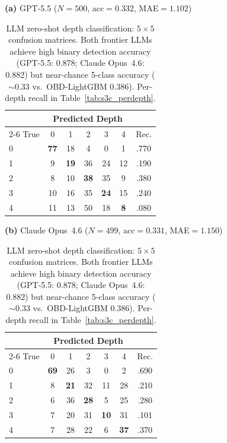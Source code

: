 \FloatBarrier
\begin{table}[t]
  \centering
  \scriptsize
  \caption{LLM zero-shot depth classification: $5{\times}5$ confusion matrices. Both frontier LLMs achieve high binary detection accuracy (GPT-5.5: 0.878; Claude Opus~4.6: 0.882) but near-chance 5-class accuracy (${\sim}$0.33 vs.\ OBD-LightGBM 0.386). Per-depth recall in Table~\ref{tab:s3c_perdepth}.}
  \label{tab:s3_llm_zeroshot}

  \vspace{0.3em}
  \textbf{(a)} GPT-5.5 ($N{=}500$, acc${=}0.332$, MAE${=}1.102$)
  \vspace{1pt}

  \begin{tabular}{lcccccc}
    \toprule
    & \multicolumn{5}{c}{Predicted Depth} & \\
    \cmidrule(lr){2-6}
    True & 0 & 1 & 2 & 3 & 4 & Rec. \\
    \midrule
    0 & \textbf{77} & 18 &  4 &  0 &  1 & .770 \\
    1 &  9 & \textbf{19} & 36 & 24 & 12 & .190 \\
    2 &  8 & 10 & \textbf{38} & 35 &  9 & .380 \\
    3 & 10 & 16 & 35 & \textbf{24} & 15 & .240 \\
    4 & 11 & 13 & 50 & 18 &  \textbf{8} & .080 \\
    \bottomrule
  \end{tabular}

  \vspace{4pt}
  \textbf{(b)} Claude Opus~4.6 ($N{=}499$, acc${=}0.331$, MAE${=}1.150$)
  \vspace{1pt}

  \begin{tabular}{lcccccc}
    \toprule
    & \multicolumn{5}{c}{Predicted Depth} & \\
    \cmidrule(lr){2-6}
    True & 0 & 1 & 2 & 3 & 4 & Rec. \\
    \midrule
    0 & \textbf{69} & 26 &  3 &  0 &  2 & .690 \\
    1 &  8 & \textbf{21} & 32 & 11 & 28 & .210 \\
    2 &  6 & 36 & \textbf{28} &  5 & 25 & .280 \\
    3 &  7 & 20 & 31 & \textbf{10} & 31 & .101 \\
    4 &  7 & 28 & 22 &  6 & \textbf{37} & .370 \\
    \bottomrule
  \end{tabular}
\end{table}

